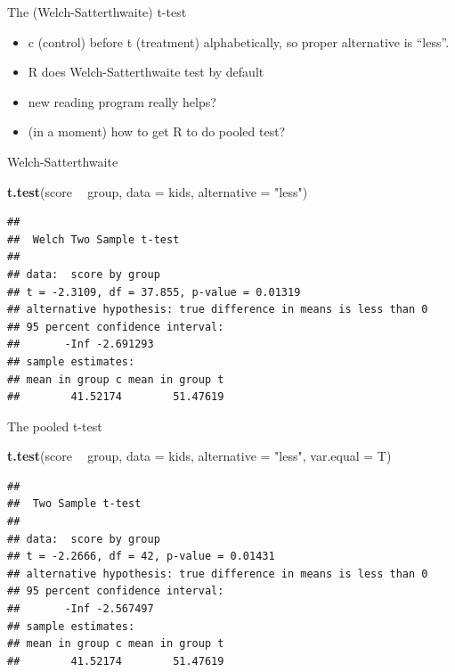 \documentclass[ignorenonframetext,]{beamer}
\newenvironment{Shaded}{\begin{snugshade}}{\end{snugshade}}
\newcommand{\DataTypeTok}[1]{\textcolor[rgb]{0.13,0.29,0.53}{#1}}
\newcommand{\KeywordTok}[1]{\textcolor[rgb]{0.13,0.29,0.53}{\textbf{#1}}}
\newcommand{\NormalTok}[1]{#1}
\newcommand{\OperatorTok}[1]{\textcolor[rgb]{0.81,0.36,0.00}{\textbf{#1}}}
\newcommand{\StringTok}[1]{\textcolor[rgb]{0.31,0.60,0.02}{#1}}
\providecommand{\tightlist}{%
  \setlength{\itemsep}{0pt}\setlength{\parskip}{0pt}}
\begin{document}
\begin{frame}{The (Welch-Satterthwaite) t-test}
\protect\hypertarget{the-welch-satterthwaite-t-test}{}

\begin{itemize}
\tightlist
\item
  c (control) before t (treatment) alphabetically, so proper alternative
  is ``less''.
\item
  R does Welch-Satterthwaite test by default
\item
  new reading program really helps?
\item
  (in a moment) how to get R to do pooled test?
\end{itemize}

\end{frame}

\begin{frame}[fragile]{Welch-Satterthwaite}
\protect\hypertarget{welch-satterthwaite}{}

\begin{Shaded}
\begin{Highlighting}[]
\KeywordTok{t.test}\NormalTok{(score }\OperatorTok{~}\StringTok{ }\NormalTok{group, }\DataTypeTok{data =}\NormalTok{ kids, }\DataTypeTok{alternative =} \StringTok{"less"}\NormalTok{)}
\end{Highlighting}
\end{Shaded}

\begin{verbatim}
## 
##  Welch Two Sample t-test
## 
## data:  score by group
## t = -2.3109, df = 37.855, p-value = 0.01319
## alternative hypothesis: true difference in means is less than 0
## 95 percent confidence interval:
##       -Inf -2.691293
## sample estimates:
## mean in group c mean in group t 
##        41.52174        51.47619
\end{verbatim}

\end{frame}

\begin{frame}[fragile]{The pooled t-test}
\protect\hypertarget{the-pooled-t-test}{}

\begin{Shaded}
\begin{Highlighting}[]
\KeywordTok{t.test}\NormalTok{(score }\OperatorTok{~}\StringTok{ }\NormalTok{group, }\DataTypeTok{data =}\NormalTok{ kids, }
       \DataTypeTok{alternative =} \StringTok{"less"}\NormalTok{, }\DataTypeTok{var.equal =}\NormalTok{ T)}
\end{Highlighting}
\end{Shaded}

\begin{verbatim}
## 
##  Two Sample t-test
## 
## data:  score by group
## t = -2.2666, df = 42, p-value = 0.01431
## alternative hypothesis: true difference in means is less than 0
## 95 percent confidence interval:
##       -Inf -2.567497
## sample estimates:
## mean in group c mean in group t 
##        41.52174        51.47619
\end{verbatim}

\end{frame}
\end{document}
